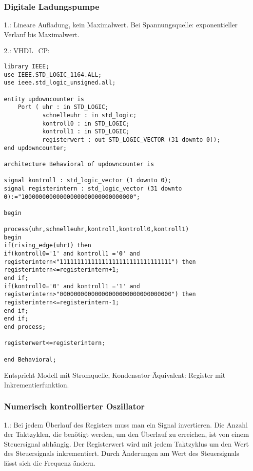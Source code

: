 \documentclass{article}
\begin{document}
\subsubsection{Digitale Ladungspumpe}
1.:\newline
Lineare Aufladung, kein Maximalwert. Bei Spannungsquelle: exponentieller Verlauf bis Maximalwert.\newline

2.:\newline
VHDL\_CP:\newline
\begin{verbatim}
library IEEE;
use IEEE.STD_LOGIC_1164.ALL;
use ieee.std_logic_unsigned.all;

entity updowncounter is
    Port ( uhr : in STD_LOGIC;
           schnelleuhr : in std_logic;
           kontroll0 : in STD_LOGIC;
           kontroll1 : in STD_LOGIC;
           registerwert : out STD_LOGIC_VECTOR (31 downto 0));
end updowncounter;

architecture Behavioral of updowncounter is

signal kontroll : std_logic_vector (1 downto 0);
signal registerintern : std_logic_vector (31 downto 0):="10000000000000000000000000000000";

begin

process(uhr,schnelleuhr,kontroll,kontroll0,kontroll1)
begin
if(rising_edge(uhr)) then
if(kontroll0='1' and kontroll1 ='0' and registerintern<"11111111111111111111111111111111") then
registerintern<=registerintern+1;
end if;
if(kontroll0='0' and kontroll1 ='1' and registerintern>"00000000000000000000000000000000") then
registerintern<=registerintern-1;
end if;
end if;
end process;

registerwert<=registerintern;

end Behavioral;

\end{verbatim}
Entspricht Modell mit Stromquelle, Kondensator-\"Aquivalent: Register mit Inkrementierfunktion.

\subsubsection{Numerisch kontrollierter Oszillator}
1.:\newline
Bei jedem \"Uberlauf des Registers muss man ein Signal invertieren. Die Anzahl der Taktzyklen, die ben\"otigt werden, um den \"Uberlauf zu erreichen, ist von einem Steuersignal abh\"angig. Der Registerwert wird mit jedem Taktzyklus um den Wert des Steuersignals inkrementiert. Durch \"Anderungen am Wert des Steuersignals l\"asst sich die Frequenz \"andern.
\end{document}
